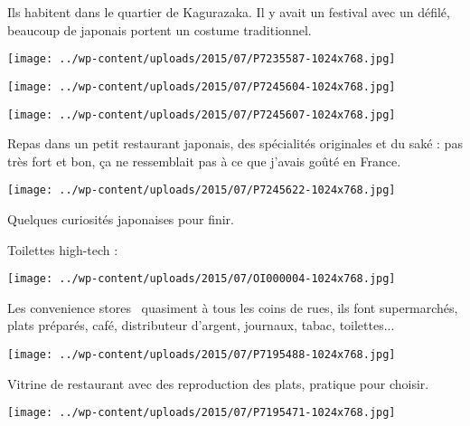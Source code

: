 \pagebreak
 Ils habitent dans le quartier de Kagurazaka. Il y avait un festival avec un défilé, beaucoup de japonais portent un costume traditionnel. 
\begin{center} \texttt{[image: ../wp-content/uploads/2015/07/P7235587-1024x768.jpg]} \end{center}
\begin{center} \texttt{[image: ../wp-content/uploads/2015/07/P7245604-1024x768.jpg]} \end{center}
\begin{center} \texttt{[image: ../wp-content/uploads/2015/07/P7245607-1024x768.jpg]} \end{center}

 Repas dans un petit restaurant japonais, des spécialités originales et du saké : pas très fort et bon, ça ne ressemblait pas à ce que j'avais goûté en France. 
\begin{center} \texttt{[image: ../wp-content/uploads/2015/07/P7245622-1024x768.jpg]} \end{center}

\pagebreak
 Quelques curiosités japonaises pour finir. 

 Toilettes high-tech :
\begin{center} \texttt{[image: ../wp-content/uploads/2015/07/OI000004-1024x768.jpg]} \end{center}

 Les \og convenience stores \fg\ quasiment à tous les coins de rues, ils font supermarchés, plats préparés, café, distributeur d'argent, journaux, tabac, toilettes...
\begin{center} \texttt{[image: ../wp-content/uploads/2015/07/P7195488-1024x768.jpg]} \end{center}

 Vitrine de restaurant avec des reproduction des plats, pratique pour choisir. 
\begin{center} \texttt{[image: ../wp-content/uploads/2015/07/P7195471-1024x768.jpg]} \end{center}